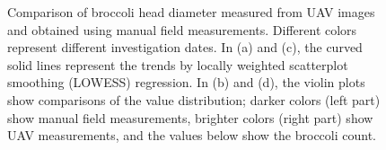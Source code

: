 \begin{figure}[htb]
  \begin{center}
  \end{center}
  \caption[Comparison of broccoli head diameter measured from UAV images and obtained using manual field measurements]{
    Comparison of broccoli head diameter measured from UAV images and obtained using manual field measurements. Different colors represent different investigation dates. 
    In (a) and (c), the curved solid lines represent the trends by locally weighted scatterplot smoothing (LOWESS) regression. 
    In (b) and (d), the violin plots show comparisons of the value distribution; 
    darker colors (left part) show manual field measurements, brighter colors (right part) show UAV measurements, and the values below show the broccoli count.
  }
  \label{fig:bro1}
\end{figure}